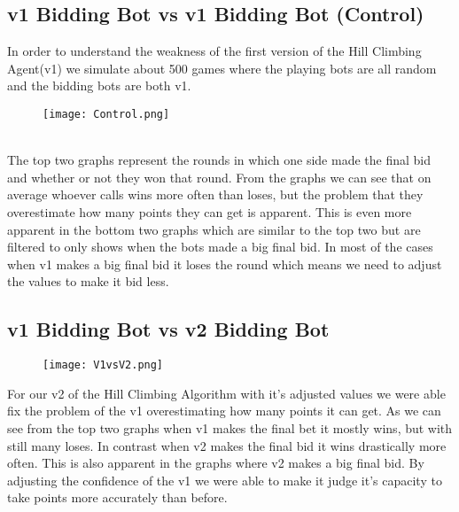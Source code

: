 \subsection{v1 Bidding Bot vs v1 Bidding Bot (Control)}
In order to understand the weakness of the first version of the Hill Climbing Agent(v1) we simulate about 500 games where the playing bots are all random and the bidding bots are both v1.
\begin{figure}[h]
    \centering
    \texttt{[image: Control.png]}
\end{figure}\\
The top two graphs represent the rounds in which one side made the final bid and whether or not they won that round. 
From the graphs we can see that on average whoever calls wins more often than loses, but the problem that they overestimate how many points they can get is apparent. 
This is even more apparent in the bottom two graphs which are similar to the top two but are filtered to only shows when the bots made a big final bid.
In most of the cases when v1 makes a big final bid it loses the round which means we need to adjust the values to make it bid less.
\pagebreak
\subsection{v1 Bidding Bot vs v2 Bidding Bot}
\begin{figure}[h]
    \centering
    \texttt{[image: V1vsV2.png]}
\end{figure}
For our v2 of the Hill Climbing Algorithm with it's adjusted values we were able fix the problem of the v1 overestimating how many points it can get.
As we can see from the top two graphs when v1 makes the final bet it mostly wins, but with still many loses. 
In contrast when v2 makes the final bid it wins drastically more often. 
This is also apparent in the graphs where v2 makes a big final bid. By adjusting the confidence of the v1 we were
able to make it judge it's capacity to take points more accurately than before. 
